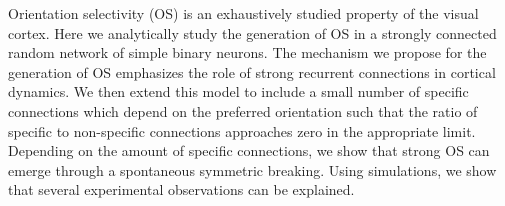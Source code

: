 Orientation selectivity (OS) is an exhaustively studied property of the visual cortex. Here we analytically study the generation of OS in a strongly connected random network of simple binary neurons. The mechanism we propose for the generation of OS emphasizes the role of strong recurrent connections in cortical dynamics. We then extend this model to include a small number of specific connections which depend on the preferred orientation such that the ratio of specific to non-specific connections approaches zero in the appropriate limit. Depending on the amount of specific connections, we show that strong OS can emerge through a spontaneous symmetric breaking. Using simulations, we show that several experimental observations can be explained. 